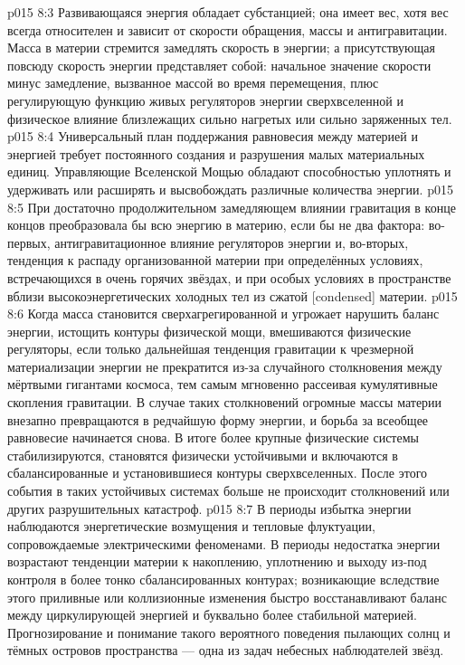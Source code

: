 \vs p015 8:3 \pc Развивающаяся энергия обладает субстанцией; она имеет вес, хотя вес всегда относителен и зависит от скорости обращения, массы и антигравитации. Масса в материи стремится замедлять скорость в энергии; а присутствующая повсюду скорость энергии представляет собой: начальное значение скорости минус замедление, вызванное массой во время перемещения, плюс регулирующую функцию живых регуляторов энергии сверхвселенной и физическое влияние близлежащих сильно нагретых или сильно заряженных тел.
\vs p015 8:4 Универсальный план поддержания равновесия между материей и энергией требует постоянного создания и разрушения малых материальных единиц. Управляющие Вселенской Мощью обладают способностью уплотнять и удерживать или расширять и высвобождать различные количества энергии.
\vs p015 8:5 При достаточно продолжительном замедляющем влиянии гравитация в конце концов преобразовала бы всю энергию в материю, если бы не два фактора: во\hyp{}первых, антигравитационное влияние регуляторов энергии и, во\hyp{}вторых, тенденция к распаду организованной материи при определённых условиях, встречающихся в очень горячих звёздах, и при особых условиях в пространстве вблизи высокоэнергетических холодных тел из сжатой [condensed] материи.
\vs p015 8:6 Когда масса становится сверхагрегированной и угрожает нарушить баланс энергии, истощить контуры физической мощи, вмешиваются физические регуляторы, если только дальнейшая тенденция гравитации к чрезмерной материализации энергии не прекратится из\hyp{}за случайного столкновения между мёртвыми гигантами космоса, тем самым мгновенно рассеивая кумулятивные скопления гравитации. В случае таких столкновений огромные массы материи внезапно превращаются в редчайшую форму энергии, и борьба за всеобщее равновесие начинается снова. В итоге более крупные физические системы стабилизируются, становятся физически устойчивыми и включаются в сбалансированные и установившиеся контуры сверхвселенных. После этого события в таких устойчивых системах больше не происходит столкновений или других разрушительных катастроф.
\vs p015 8:7 В периоды избытка энергии наблюдаются энергетические возмущения и тепловые флуктуации, сопровождаемые электрическими феноменами. В периоды недостатка энергии возрастают тенденции материи к накоплению, уплотнению и выходу из\hyp{}под контроля в более тонко сбалансированных контурах; возникающие вследствие этого приливные или коллизионные изменения быстро восстанавливают баланс между циркулирующей энергией и буквально более стабильной материей. Прогнозирование и понимание такого вероятного поведения пылающих солнц и тёмных островов пространства --- одна из задач небесных наблюдателей звёзд.
